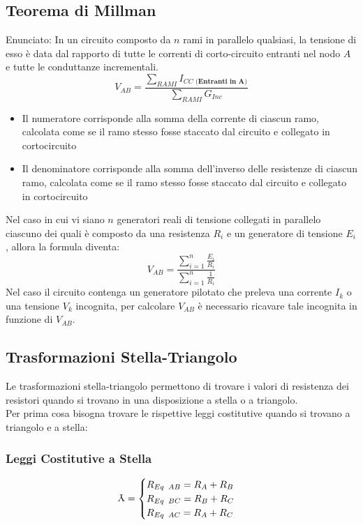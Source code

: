 \documentclass[../main.tex]{subfiles}
\begin{document}
	\subsection{Teorema di Millman}
	Enunciato:
	In un circuito composto da $n$ rami in parallelo qualsiasi, la tensione di esso è data dal rapporto di tutte le correnti di corto-circuito entranti nel nodo $A$ e tutte le conduttanze incrementali.
	\[V_{AB} = \frac{\sum_{RAMI} I_{CC\textbf{ (Entranti in A)}}}{\sum_{RAMI} G_{Inc}}\]
	\begin{itemize}
		\item Il numeratore corrisponde alla somma della corrente di ciascun ramo, calcolata come se il ramo stesso fosse staccato dal circuito e collegato in cortocircuito
		\item Il denominatore corrisponde alla somma dell’inverso delle resistenze di ciascun ramo, calcolata come se il ramo stesso fosse staccato dal circuito e collegato in cortocircuito
	\end{itemize}
	Nel caso in cui vi siano $n$ generatori reali di tensione collegati in parallelo ciascuno dei quali è composto da una resistenza $R_i$ e un generatore di tensione $E_i$, allora la formula diventa:
	\[V_{AB} = \frac{\sum_{i=1}^{n} \frac{E_i}{R_i}}{\sum_{i=1}^{n} \frac{1}{R_i}}\]
	Nel caso il circuito contenga un generatore pilotato che preleva una corrente $I_k$ o una tensione $V_k$ incognita, per calcolare $V_{AB}$ è necessario ricavare tale incognita in funzione di $V_{AB}$.
	\subsection{Trasformazioni Stella-Triangolo}
	Le trasformazioni stella-triangolo permettono di trovare i valori di resistenza dei resistori quando si trovano in una disposizione a stella o a triangolo.\\
	Per prima cosa bisogna trovare le rispettive leggi costitutive quando si trovano a triangolo e a stella:
	\subsubsection{Leggi Costitutive a Stella}
	\[
	\rotatebox[origin=c]{180}{Y} =
	\begin{cases}
		R_{Eq \;\; AB} = R_A + R_B \\
		R_{Eq \;\; BC} = R_B + R_C \\
		R_{Eq \;\; AC} = R_A + R_C
	\end{cases}
	\]
\end{document}
